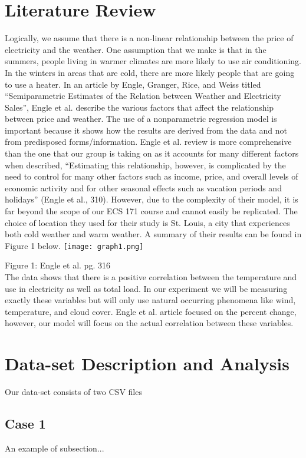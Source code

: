 \documentclass[10pt]{article}
\begin{document}
\section{Literature Review}\label{sec:2}
Logically, we assume that there is a non-linear relationship between the price of electricity and the weather. One assumption that we make is that in the summers, people living in warmer climates are more likely to use air conditioning. In the winters in areas that are cold, there are more likely people that are going to use a heater. In an article by Engle, Granger, Rice, and Weiss titled “Semiparametric Estimates of the Relation between Weather and Electricity Sales”, Engle et al. describe the various factors that affect the relationship between price and weather. The use of a nonparametric regression model is important because it shows how the results are derived from the data and not from predisposed forms/information. Engle et al. review is more comprehensive than the one that our group is taking on as it accounts for many different factors when described, “Estimating this relationship, however, is complicated by the need to control for many other factors such as income, price, and overall levels of economic activity and for other seasonal effects such as vacation periods and holidays” (Engle et al., 310). However, due to the complexity of their model, it is far beyond the scope of our ECS 171 course and cannot easily be replicated. The choice of location they used for their study is St. Louis, a city that experiences both cold weather and warm weather. A summary of their results can be found in Figure 1 below.
\texttt{[image: graph1.png]}

Figure 1: Engle et al. pg. 316
\\The data shows that there is a positive correlation between the temperature and use in electricity as well as total load. In our experiment we will be measuring exactly these variables but will only use natural occurring phenomena like wind, temperature, and cloud cover. Engle et al. article focused on the percent change, however, our model will focus on the actual correlation between these variables.


\section{Data-set Description and Analysis}\label{sec:3}
Our data-set consists of two CSV files 

\subsection{Case 1}
An example of subsection...
\end{document}
